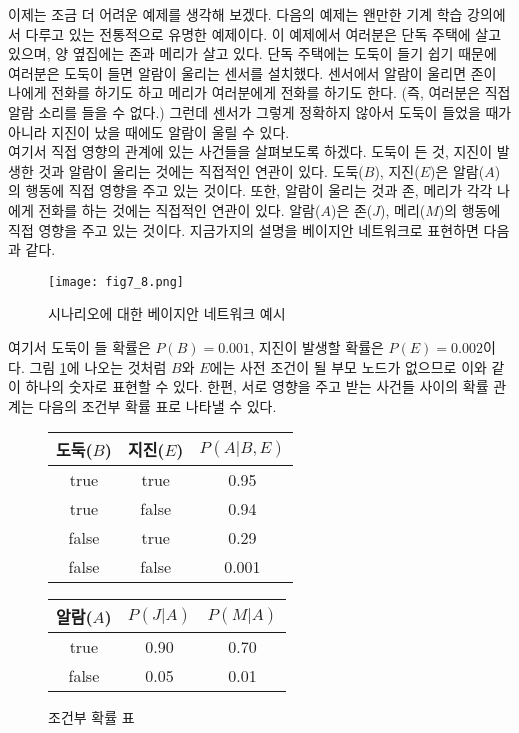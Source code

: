 \documentclass[a4paper]{oblivoir}
\begin{document}
이제는 조금 더 어려운 예제를 생각해 보겠다. 다음의 예제는 왠만한 기계 학습 강의에서 다루고 있는 전통적으로 유명한 예제이다. 이 예제에서 여러분은 단독 주택에 살고 있으며, 양 옆집에는 존과 메리가 살고 있다. 단독 주택에는 도둑이 들기 쉽기 때문에 여러분은 도둑이 들면 알람이 울리는 센서를 설치했다. 센서에서 알람이 울리면 존이 나에게 전화를 하기도 하고 메리가 여러분에게 전화를 하기도 한다. (즉, 여러분은 직접 알람 소리를 들을 수 없다.) 그런데 센서가 그렇게 정확하지 않아서 도둑이 들었을 때가 아니라 지진이 났을 때에도 알람이 울릴 수 있다. \\

여기서 직접 영향의 관계에 있는 사건들을 살펴보도록 하겠다. 도둑이 든 것, 지진이 발생한 것과 알람이 울리는 것에는 직접적인 연관이 있다. 도둑($B$), 지진($E$)은 알람($A$)의 행동에 직접 영향을 주고 있는 것이다. 또한, 알람이 울리는 것과 존, 메리가 각각 나에게 전화를 하는 것에는 직접적인 연관이 있다. 알람($A$)은 존($J$), 메리($M$)의 행동에 직접 영향을 주고 있는 것이다. 지금가지의 설명을 베이지안 네트워크로 표현하면 다음과 같다. \\

\begin{figure}[ht] \centering 
\texttt{[image: fig7\_8.png]} 
\caption{시나리오에 대한 베이지안 네트워크 예시}
\label{fig:7-8}
\end{figure} 

여기서 도둑이 들 확률은 $P(B)=0.001$, 지진이 발생할 확률은 $P(E)=0.002$이다. 그림 \ref{fig:7-8}에 나오는 것처럼 $B$와 $E$에는 사전 조건이 될 부모 노드가 없으므로 이와 같이 하나의 숫자로 표현할 수 있다. 한편, 서로 영향을 주고 받는 사건들 사이의 확률 관계는 다음의 조건부 확률 표로 나타낼 수 있다. \\

\begin{figure}[ht] \centering 
\parbox[t]{3cm}
{
\begin{tabular}{|c|c|c|}
  \hline
  도둑($B$) & 지진($E$) & $P(A|B,E)$ \\
  \hline
  true & true & 0.95 \\
  \hline
  true & false & 0.94 \\
  \hline
  false & true & 0.29 \\
  \hline
  false & false & 0.001 \\
  \hline
\end{tabular}
} \hspace{3cm}
\parbox[t]{5cm}
{
\begin{tabular}{|c|c|c|}
  \hline
  알람($A$) & $P(J|A)$ & $P(M|A)$ \\
  \hline
  true & 0.90 & 0.70 \\
  \hline
  false & 0.05 & 0.01 \\
  \hline
\end{tabular}
}
\caption{조건부 확률 표}
\label{fig:7-9}
\end{figure} 
\end{document}
